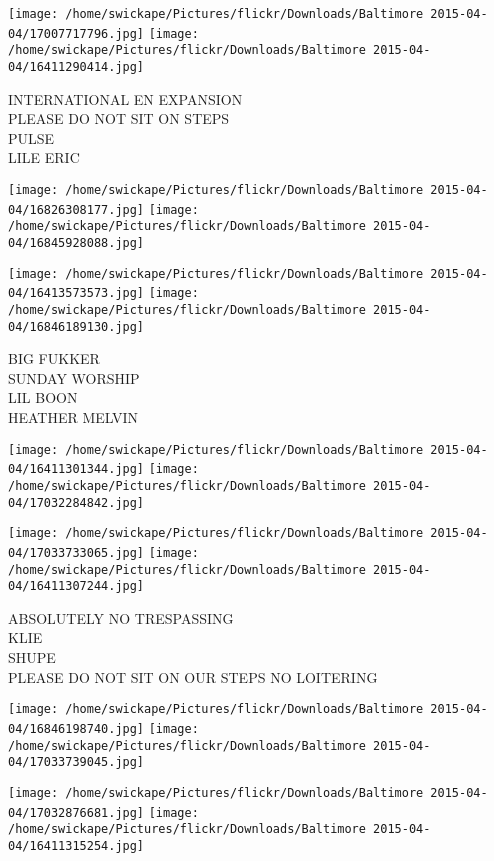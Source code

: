 \documentclass[10pt,letterpaper]{article}
\begin{document}
\texttt{[image: /home/swickape/Pictures/flickr/Downloads/Baltimore 2015-04-04/17007717796.jpg]}
\texttt{[image: /home/swickape/Pictures/flickr/Downloads/Baltimore 2015-04-04/16411290414.jpg]}

INTERNATIONAL EN EXPANSION\\
PLEASE DO NOT SIT ON STEPS\\
PULSE\\
LILE ERIC\\
\pagebreak

\texttt{[image: /home/swickape/Pictures/flickr/Downloads/Baltimore 2015-04-04/16826308177.jpg]}
\texttt{[image: /home/swickape/Pictures/flickr/Downloads/Baltimore 2015-04-04/16845928088.jpg]}

\texttt{[image: /home/swickape/Pictures/flickr/Downloads/Baltimore 2015-04-04/16413573573.jpg]}
\texttt{[image: /home/swickape/Pictures/flickr/Downloads/Baltimore 2015-04-04/16846189130.jpg]}

BIG FUKKER\\
SUNDAY WORSHIP\\
LIL BOON\\
HEATHER MELVIN\\
\pagebreak

\texttt{[image: /home/swickape/Pictures/flickr/Downloads/Baltimore 2015-04-04/16411301344.jpg]}
\texttt{[image: /home/swickape/Pictures/flickr/Downloads/Baltimore 2015-04-04/17032284842.jpg]}

\texttt{[image: /home/swickape/Pictures/flickr/Downloads/Baltimore 2015-04-04/17033733065.jpg]}
\texttt{[image: /home/swickape/Pictures/flickr/Downloads/Baltimore 2015-04-04/16411307244.jpg]}

ABSOLUTELY NO TRESPASSING\\
KLIE\\
SHUPE\\
PLEASE DO NOT SIT ON OUR STEPS NO LOITERING\\
\pagebreak

\texttt{[image: /home/swickape/Pictures/flickr/Downloads/Baltimore 2015-04-04/16846198740.jpg]}
\texttt{[image: /home/swickape/Pictures/flickr/Downloads/Baltimore 2015-04-04/17033739045.jpg]}

\texttt{[image: /home/swickape/Pictures/flickr/Downloads/Baltimore 2015-04-04/17032876681.jpg]}
\texttt{[image: /home/swickape/Pictures/flickr/Downloads/Baltimore 2015-04-04/16411315254.jpg]}
\end{document}
